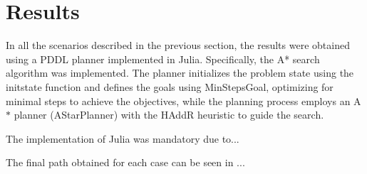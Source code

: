 \section{Results}
In all the scenarios described in the previous section, the results were obtained using a PDDL planner implemented in Julia. 
Specifically, the A* search algorithm was implemented. The planner initializes the problem state using the initstate function and 
defines the goals using MinStepsGoal, optimizing for minimal steps to achieve the objectives, while the planning process employs an A$*$ 
planner (AStarPlanner) with the HAddR heuristic to guide the search.


The implementation of Julia was mandatory due to...


The final path obtained for each case can be seen in ...